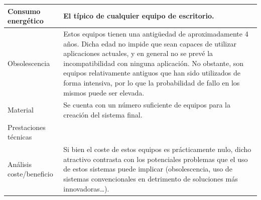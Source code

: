 \begin{table}
\begin{tabular}{|p{2.3cm}|p{12cm}|}
\\
\hline
Consumo energético&El típico de cualquier equipo de escritorio.\\
\hline
Obsolescencia&Estos equipos tienen una antigüedad de aproximadamente 4 años. Dicha edad no impide que sean capaces de utilizar aplicaciones actuales, y en general no se prevé la incompatibilidad con ninguna aplicación. No obstante, son equipos relativamente antiguos que han sido utilizados de forma intensiva, por lo que la probabilidad de fallo en los mismos puede ser elevada.\\
\hline
Material&Se cuenta con un número suficiente de equipos para la creación del sistema final.\\
\hline
Prestaciones técnicas&\\
\hline
Análisis coste/beneficio&Si bien el coste de estos equipos es prácticamente nulo, dicho atractivo contrasta con los potenciales problemas que el uso de estos sistemas puede implicar (obsolescencia, uso de sistemas convencionales en detrimento de soluciones más innovadoras\dots).\\
\hline
\end{tabular}
\end{table}

